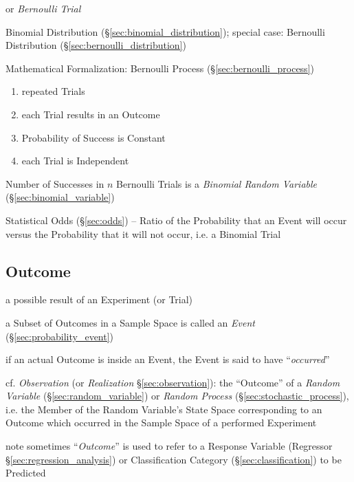 or \emph{Bernoulli Trial}

Binomial Distribution (\S\ref{sec:binomial_distribution}); special case:
Bernoulli Distribution (\S\ref{sec:bernoulli_distribution})

Mathematical Formalization: Bernoulli Process (\S\ref{sec:bernoulli_process})

\begin{enumerate}
  \item repeated Trials
  \item each Trial results in an Outcome
  \item Probability of Success is Constant
  \item each Trial is Independent
\end{enumerate}

Number of Successes in $n$ Bernoulli Trials is a \emph{Binomial Random
  Variable} (\S\ref{sec:binomial_variable})

\fist Statistical Odds (\S\ref{sec:odds}) -- Ratio of the Probability that an
Event will occur versus the Probability that it will not occur, i.e. a Binomial
Trial



\subsection{Outcome}\label{sec:outcome}

a possible result of an Experiment (or Trial)

a Subset of Outcomes in a Sample Space is called an \emph{Event}
(\S\ref{sec:probability_event})

if an actual Outcome is inside an Event, the Event is said to have
``\emph{occurred}''

\fist cf. \emph{Observation} (or \emph{Realization} \S\ref{sec:observation}):
the ``Outcome'' of a \emph{Random Variable} (\S\ref{sec:random_variable}) or
\emph{Random Process} (\S\ref{sec:stochastic_process}), i.e. the Member of the
Random Variable's State Space corresponding to an Outcome which occurred in the
Sample Space of a performed Experiment

\fist note sometimes ``\emph{Outcome}'' is used to refer to a Response Variable
(Regressor \S\ref{sec:regression_analysis}) or Classification Category
(\S\ref{sec:classification}) to be Predicted



